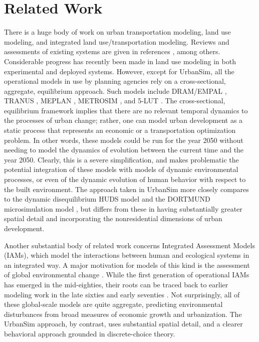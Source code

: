 
\section{Related Work}
\label{sec:relatedwork}

There is a huge body of work on urban transportation modeling,
land use modeling, and integrated land use/transportation
modeling.  Reviews and assessments of existing systems are given in
references
\citet{dowling-nchrp-2000,epa-report-2000,miller-tcrp-1999,parsons-1998,southworth-1995},
among others. Considerable progress has recently been made in land
use modeling in both experimental and deployed systems. However,
except for UrbanSim, all the operational models in use by planning
agencies rely on a cross-sectional, aggregate, equilibrium
approach.  Such models include DRAM/EMPAL
\citep{putman-book-1983}, TRANUS \citep{delabarra-book-1995},
MEPLAN \citep{echenique-transport-reviews-1990}, METROSIM
\citep{anas-book-1994}, and 5-LUT
\citep{martinez-env-planning-1992}.  The cross-sectional,
equilibrium framework implies that there are no relevant temporal
dynamics to the processes of urban change; rather, one can model
urban development as a static process that represents an economic
or a transportation optimization problem.  In other words, these
models could be run for the year 2050 without needing to model the
dynamics of evolution between the current time and the year 2050.
Clearly, this is a severe simplification, and makes problematic
the potential integration of these models with models of dynamic
environmental processes, or even of the dynamic evolution of human
behavior with respect to the built environment.  The approach
taken in UrbanSim more closely compares to the dynamic
disequilibrium HUDS model \citep{kain-book-1985} and the DORTMUND
microsimulation model
\citep{wegener-dortmund-1983,wegener-spiekermann-1996}, but
differs from these in having substantially greater spatial detail
and incorporating the nonresidential dimensions of urban
development.


Another substantial body of related work concerns Integrated
Assessment Models (IAMs), which model the interactions between
human and ecological systems in an integrated way.  A major
motivation for models of this kind is the assessment of global
environmental change
\citep{alberti-envplanning-1999,dowlatibadi-1995,parson-1995,rotmans-1995,weyant-1996}.
While the first generation of operational IAMs has emerged in the
mid-eighties, their roots can be traced back to earlier modeling
work in the late sixties and early seventies
\citep{forrester-book-1971,isard-1969,meadows-book-1982,odum-book-1983}.
Not surprisingly, all of these global-scale models are quite
aggregate, predicting environmental disturbances from broad
measures of economic growth and urbanization.  The UrbanSim
approach, by contrast, uses substantial spatial detail, and a
clearer behavioral approach grounded in discrete-choice theory.

